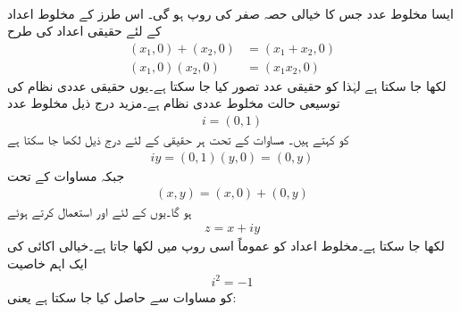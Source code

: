 \\
ایسا مخلوط عدد جس کا خیالی حصہ صفر کی روپ  ہو گی۔ اس طرز کے مخلوط اعداد کے لئے حقیقی اعداد کی طرح 
\begin{align*}
(x_1,0)+(x_2,0)&=(x_1+x_2,0)\\
(x_1,0)(x_2,0)&=(x_1x_2,0)
\end{align*}
لکھا جا سکتا ہے لہٰذا   کو حقیقی عدد تصور کیا جا سکتا ہے۔یوں حقیقی عددی نظام کی توسیعی حالت مخلوط عددی نظام ہے۔مزید درج ذیل مخلوط عدد
\begin{align*}
i=(0,1)
\end{align*}
 کو  کہتے ہیں۔ مساوات  کے تحت ہر حقیقی  کے لئے درج ذیل لکھا جا سکتا ہے
\begin{align*}
iy=(0,1)(y,0)=(0,y)
\end{align*}
جبکہ مساوات  کے تحت
\begin{align*}
(x,y)=(x,0)+(0,y)
\end{align*}
ہو گا۔یوں  کے لئے  اور  استعمال کرتے ہوئے 
\begin{align*}
z=x+iy
\end{align*}
لکھا جا سکتا ہے۔مخلوط اعداد کو عموماً اسی روپ میں لکھا جاتا ہے۔خیالی اکائی  کی ایک اہم خاصیت 
\begin{align}\label{مساوات_مخلوط_مربع_خیالی_اکائی}
i^2=-1
\end{align}
کو مساوات  سے حاصل کیا جا سکتا ہے یعنی:    

